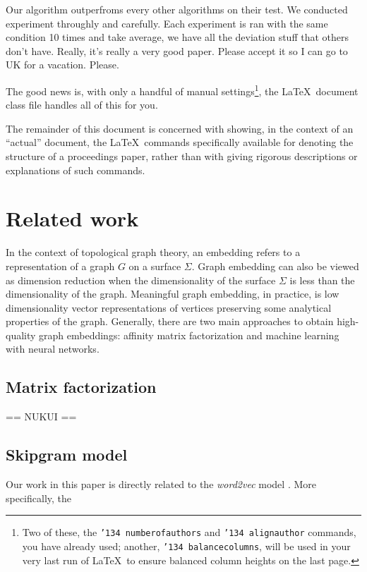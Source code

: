 \documentclass{sig-alternate-05-2015}
\begin{document}
Our algorithm outperfroms every other algorithms on their test.
We conducted experiment throughly and carefully. Each experiment is ran
with the same condition 10 times and take average, we have all the deviation
stuff that others don't have. Really, it's really a very good paper.
Please accept it so I can go to UK for a vacation. Please.

The good news is, with only a handful of manual
settings\footnote{Two of these, the {\texttt{\char'134 numberofauthors}}
and {\texttt{\char'134 alignauthor}} commands, you have
already used; another, {\texttt{\char'134 balancecolumns}}, will
be used in your very last run of \LaTeX\ to ensure
balanced column heights on the last page.}, the \LaTeX\ document
class file handles all of this for you.

The remainder of this document is concerned with showing, in
the context of an ``actual'' document, the \LaTeX\ commands
specifically available for denoting the structure of a
proceedings paper, rather than with giving rigorous descriptions
or explanations of such commands.

\section{Related work}

In the context of topological graph theory, an embedding refers to a
representation of a graph $G$ on a surface $\Sigma$. Graph embedding
can also be viewed as dimension reduction when the dimensionality
of the surface $\Sigma$ is less than the dimensionality of the graph.
Meaningful graph embedding, in practice, is low dimensionality vector
representations of vertices preserving some analytical properties of
the graph. Generally, there are two main approaches to obtain high-quality
graph embeddings: affinity matrix factorization and machine learning
with neural networks.

\subsection{Matrix factorization}

== NUKUI ==

\subsection{Skipgram model}

Our work in this paper is directly related to
the \emph{word2vec} model \cite{w2c}. More specifically,
the 
\end{document}
